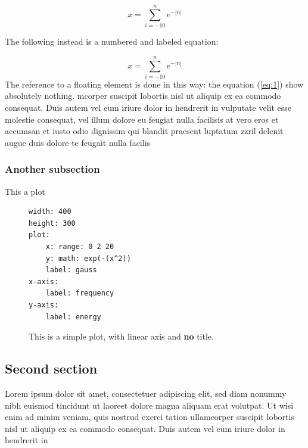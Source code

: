 \documentclass[a4paper,10pt]{article}
\begin{document}
\[
x = \sum_{i=-10}^n e^{-|n|}
\]


The following instead is a numbered and labeled equation:

\begin{equation}
\label{eq:1}
x = \sum_{i=-10}^n e^{-|n|}
\end{equation}
The reference to a floating element is done in this way: the equation (\ref{eq:1}) show absolutely nothing.
mcorper suscipit lobortis nisl ut aliquip ex ea commodo consequat. Duis autem vel eum iriure dolor in hendrerit in
vulputate velit esse molestie consequat, vel illum dolore eu feugiat nulla facilisis at vero eros et
accumsan et iusto odio dignissim qui blandit praesent luptatum zzril delenit augue duis dolore te feugait nulla facilis


\subsubsection{Another subsection}

This a plot

\begin{figure}
\begin{center}

\begin{lstlisting}
width: 400
height: 300
plot:
    x: range: 0 2 20
    y: math: exp(-(x^2))
    label: gauss
x-axis:
    label: frequency
y-axis:
    label: energy
\end{lstlisting}

\caption{This is a simple plot, with linear axis and {\bf no} title.}
\label{fig:plot}
\end{center}
\end{figure}

\subsection{Second section}

Lorem ipsum
dolor sit amet, consectetuer adipiscing elit, sed diam nonummy nibh euismod tincidunt ut
laoreet dolore magna aliquam erat volutpat. Ut wisi enim ad minim veniam, quis nostrud exerci tation
ullamcorper suscipit lobortis nisl ut aliquip ex ea commodo consequat. Duis autem vel eum iriure dolor in hendrerit in
\end{document}
